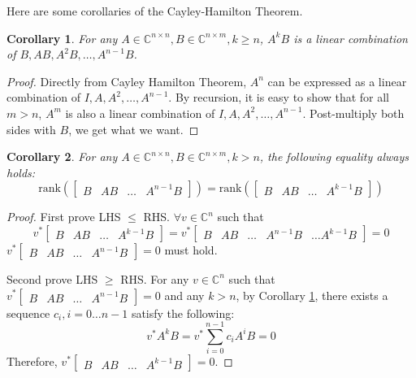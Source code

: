 \documentclass[
]{book}
\newtheorem{corollary}{Corollary}[chapter]
\theoremstyle{definition}
\theoremstyle{definition}
\theoremstyle{definition}
\theoremstyle{definition}
\theoremstyle{remark}
\begin{document}
Here are some corollaries of the Cayley-Hamilton Theorem.

\begin{corollary}
\protect\hypertarget{cor:cayham-1}{}\label{cor:cayham-1}For any \(A \in \mathbb{C}^{n \times n}, B \in \mathbb{C}^{n \times m}, k \ge n\), \(A^k B\) is a linear combination of \(B, AB, A^2B, \dots, A^{n-1}B\).
\end{corollary}

\begin{proof}
Directly from Cayley Hamilton Theorem, \(A^n\) can be expressed as a linear combination of \(I, A, A^2, \dots, A^{n-1}\). By recursion, it is easy to show that for all \(m > n\), \(A^m\) is also a linear combination of \(I, A, A^2, \dots, A^{n-1}\). Post-multiply both sides with \(B\), we get what we want.
\end{proof}

\begin{corollary}
\protect\hypertarget{cor:cayham-2}{}\label{cor:cayham-2}For any \(A \in \mathbb{C}^{n \times n}, B \in \mathbb{C}^{n \times m}, k > n\), the following equality always holds:
\[
   \text{rank}(\begin{bmatrix} B & AB & \dots & A^{n-1} B \end{bmatrix}) = 
   \text{rank}(\begin{bmatrix} B & AB & \dots & A^{k-1} B \end{bmatrix})
\]
\end{corollary}

\begin{proof}
First prove LHS \(\le\) RHS. \(\forall v \in \mathbb{C}^n\) such that
\[
   v^* \begin{bmatrix} B & AB & \dots & A^{k-1} B \end{bmatrix} = v^* \begin{bmatrix} B & AB & \dots & A^{n-1}B & \dots A^{k-1}B \end{bmatrix} = 0
\]
\(v^* \begin{bmatrix} B & AB & \dots & A^{n-1} B \end{bmatrix} = 0\) must hold.

Second prove LHS \(\ge\) RHS. For any \(v \in \mathbb{C}^n\) such that \(v^* \begin{bmatrix} B & AB & \dots & A^{n-1} B \end{bmatrix} = 0\) and any \(k > n\), by Corollary \ref{cor:cayham-1}, there exists a sequence \(c_i, i = 0 \dots n-1\) satisfy the following:
\[
   v^* A^k B = v^* \sum_{i=0}^{n-1} c_i A^i B = 0
\]
Therefore, \(v^* \begin{bmatrix} B & AB & \dots & A^{k-1} B \end{bmatrix} = 0\).
\end{proof}
\end{document}
